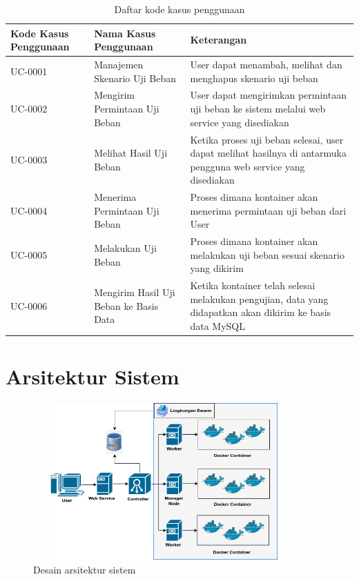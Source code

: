     	\begin{longtable}{|p{}|p{}|p{}|}
    		\caption{Daftar kode kasus penggunaan} \label{tabelusecase} \\
    		\hline
    		\textbf{Kode Kasus Penggunaan} & \textbf{Nama Kasus Penggunaan} & \textbf{Keterangan} \\ \hline
    		\endhead
    		\endfoot
    		\endlastfoot
    		UC-0001 & Manajemen Skenario Uji Beban & User dapat menambah, melihat dan menghapus skenario uji beban \\ \hline
    		UC-0002 & Mengirim Permintaan Uji Beban & User dapat mengirimkan permintaan uji beban ke sistem melalui web service yang disediakan \\ \hline
    		UC-0003 & Melihat Hasil Uji Beban & Ketika proses uji beban selesai, user dapat melihat hasilnya di antarmuka pengguna web service yang disediakan \\ \hline
    		UC-0004 & Menerima Permintaan Uji Beban & Proses dimana kontainer akan menerima permintaan uji beban dari User \\ \hline
    		UC-0005 & Melakukan Uji Beban & Proses dimana kontainer akan melakukan uji beban sesuai skenario yang dikirim \\ \hline
    		UC-0006 & Mengirim Hasil Uji Beban ke Basis Data & Ketika kontainer telah selesai melakukan pengujian, data yang didapatkan akan dikirim ke basis data MySQL \\ \hline
    	\end{longtable}
    
    \section{Arsitektur Sistem}
	    \begin{figure}[H]
	    	\centering
	    	\includegraphics[width=10cm,height=6cm]{Images/C-3/arsitektursistem.png}
	    	\caption{Desain arsitektur sistem}
	    	\label{arsitekturumum}
	    \end{figure}
    	
